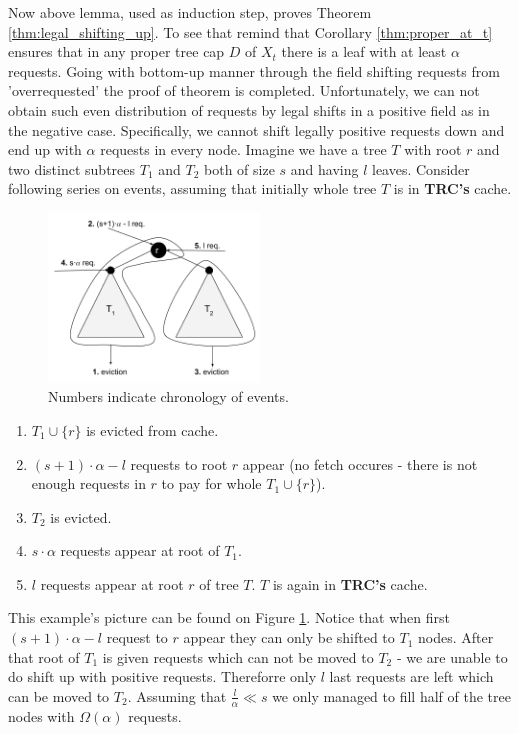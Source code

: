 Now above lemma, used as induction step, proves Theorem 
\ref{thm:legal_shifting_up}. To see that remind that 
Corollary \ref{thm:proper_at_t} ensures that in any proper tree cap $D$ of 
$X_t$ there is a leaf with at least $\alpha$ requests. Going with bottom-up 
manner through the field shifting requests from 'overrequested' the proof of 
theorem is completed.   
Unfortunately, we can not obtain such even distribution of requests by legal 
shifts in a positive field as in the negative case. Specifically, we cannot 
shift legally positive requests down and end up with $\alpha$ requests in every 
node. Imagine we have a tree $T$ with root $r$ and two distinct subtrees $T_1$ 
and $T_2$ both of size $s$ and having $l$ leaves. Consider following series on 
events, assuming that initially whole tree $T$ is in \textbf{TRC's} cache.
\begin{figure}
\vspace{-20pt}
 \begin{center}
  \includegraphics[width=0.5\textwidth]{example_not_even.png}
\end{center}
\caption{Numbers indicate chronology of events.}
\label{fig:example_not_even}
\end{figure}
\begin{enumerate}
 \item $T_1 \cup \{r\}$ is evicted from cache.
 \item $(s+1) \cdot \alpha - l$ requests to root $r$ appear (no fetch occures - 
there is not enough requests in $r$ to pay for whole $T_1 \cup \{r\}$).
 \item $T_2$ is evicted.
 \item $s \cdot \alpha$ requests appear at root of $T_1$.
 \item $l$ requests appear at root $r$ of tree $T$. $T$ is again in 
\textbf{TRC's} cache.
\end{enumerate}
This example's picture can be found on Figure \ref{fig:example_not_even}. 
Notice that when first $(s+1) \cdot \alpha - l$ request to $r$ appear they can 
only be shifted to $T_1$ nodes. After that root of $T_1$ is given requests 
which can not be moved to $T_2$ - we are unable to do shift up with positive 
requests. Thereforre only $l$ last requests are left which can be moved to 
$T_2$. Assuming that $\frac{l}{\alpha} \ll s$ we only managed to fill half of 
the tree nodes with $\Omega(\alpha)$ requests.   

